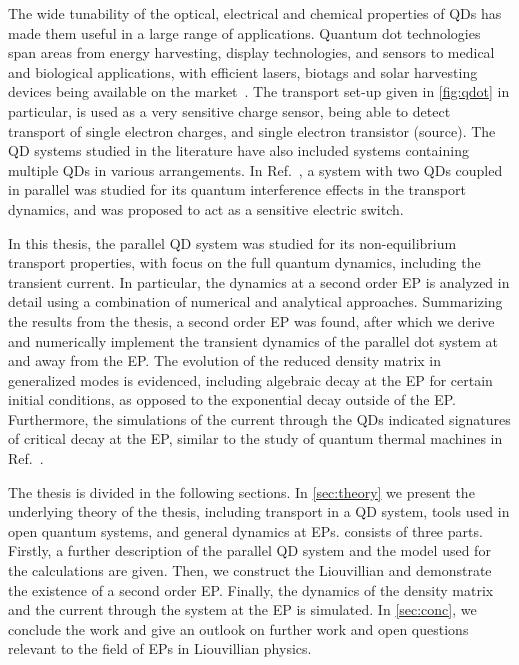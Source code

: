\documentclass[../main.tex]{subfiles}
\begin{document}
The wide tunability of the optical, electrical and chemical properties of QDs has made them useful in a large range of applications. Quantum dot technologies span areas from energy harvesting, display technologies, and sensors to medical and biological applications, with efficient lasers, biotags and solar harvesting devices being available on the market~\cite{qdotrev}. The transport set-up given in \cref{fig:qdot} in particular, is used as a very sensitive charge sensor, being able to detect transport of single electron charges, and single electron transistor (source). The QD systems studied in the literature have also included systems containing multiple QDs in various arrangements. In Ref.~\cite{doubledot}, a system with two QDs coupled in parallel was studied for its quantum interference effects in the transport dynamics, and was proposed to act as a sensitive electric switch.

In this thesis, the parallel QD system was studied for its non-equilibrium transport properties, with focus on the full quantum dynamics, including the transient current. In particular, the dynamics at a second order EP is analyzed in detail using a combination of numerical and analytical approaches. Summarizing the results from the thesis, a second order EP was found, after which we derive and numerically implement the transient dynamics of the parallel dot system at and away from the EP. The evolution of the reduced density matrix in generalized modes is evidenced, including algebraic decay at the EP for certain initial conditions, as opposed to the exponential decay outside of the EP. Furthermore, the simulations of the current through the QDs indicated signatures of critical decay at the EP, similar to the study of quantum thermal machines in Ref.~\cite{thermal}.



The thesis is divided in the following sections. In \cref{sec:theory} we present the underlying theory of the thesis, including transport in a QD system, tools used in open quantum systems, and general dynamics at EPs.  consists of three parts. Firstly, a further description of the parallel QD system and the model used for the calculations are given. Then, we construct the Liouvillian and demonstrate the existence of a second order EP. Finally, the dynamics of the density matrix and the current through the system at the EP is simulated. In \cref{sec:conc}, we conclude the work and give an outlook on further work and open questions relevant to the field of EPs in Liouvillian physics.
\end{document}
